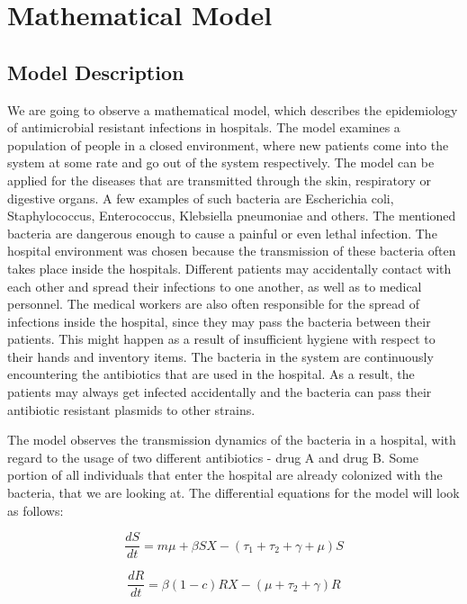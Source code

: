 \chapter{Mathematical Model}
\section{Model Description}

We are going to observe a mathematical model, which describes the epidemiology of antimicrobial resistant infections in hospitals. The model examines a population of people in a closed environment, where new patients come into the system at some rate and go out of the system respectively. The model can be applied for the diseases that are transmitted through the skin, respiratory or digestive organs. A few examples of such bacteria are Escherichia coli, Staphylococcus, Enterococcus, Klebsiella pneumoniae and others. The mentioned bacteria are dangerous enough to cause a painful or even lethal infection. The hospital environment was chosen because the transmission of these bacteria often takes place inside the hospitals. Different patients may accidentally contact with each other and spread their infections to one another, as well as to medical personnel. The medical workers are also often responsible for the spread of infections inside the hospital, since they may pass the bacteria between their patients. This might happen as a result of insufficient hygiene with respect to their hands and inventory items. The bacteria in the system are continuously encountering the antibiotics that are used in the hospital. As a result, the patients may always get infected accidentally and the bacteria can pass their antibiotic resistant plasmids to other strains.

The model observes the transmission dynamics of the bacteria in a hospital, with regard to the usage of two different antibiotics - drug A and drug B. Some portion of all individuals that enter the hospital are already colonized with the bacteria, that we are looking at. The differential equations for the model will look as follows:

\begin{equation}
\frac{dS}{dt} = m \mu + \beta S X - (\tau_1 + \tau_2 + \gamma + \mu) S
\end{equation}

\begin{equation}
\frac{dR}{dt} = \beta (1 - c) R X - (\mu + \tau_2 + \gamma) R
\end{equation}

